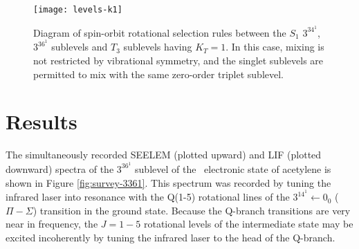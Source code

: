 \documentclass[12pt]{mitthesis}
\begin{document}
\begin{figure}
  \caption{Diagram of spin-orbit rotational selection rules between
    the $S_1$ $3^34^1$, $3^36^1$  sublevels and $T_3$ sublevels
    having $K_T=1$.  In this case, mixing is not restricted by
    vibrational symmetry, and the singlet sublevels are permitted to
    mix with the same zero-order triplet sublevel.}
  \label{fig:levels-k1}
  \centering

  \texttt{[image: levels-k1]}
\end{figure}











\section{Results}

The simultaneously recorded SEELEM (plotted upward) and LIF (plotted
downward) spectra of the $3^36^1$  sublevel of the \astate\
electronic state of acetylene is shown in Figure
\ref{fig:survey-3361}.  This spectrum was recorded by tuning the
infrared laser into resonance with the Q(1-5) rotational lines of the
$3^14^1 \leftarrow 0_0$ ($\Pi - \Sigma$) transition in the ground
state.  Because the Q-branch transitions are very near in frequency,
the $J=1-5$ rotational levels of the intermediate state may be excited
incoherently by tuning the infrared laser to the head of the Q-branch.

\end{document}
